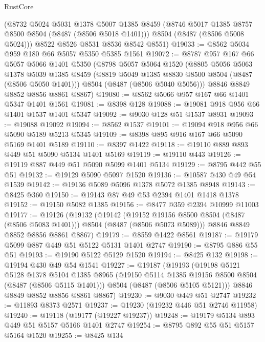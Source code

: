 \begin{lexlean}{RustCore}
\begin{coremodule}
      (@8732
        @5024
        @5031
        @1378
        @5007
        @1385
        @8459
        (@8746 @5017 @1385 @8757 @8500 @8504 (@8487 (@8506 @5018 @1401)))
        @8504
        (@8487 (@8506 @5008 @5024)))
      @8522
      @8526
      @8531
      @8536
      @8542
      @8551)
@19033 := @8562 @5034 @959 @180 @66 @5057 @5350 @5385 @1561
@19072 := @8787
    @957
    @167
    @66
    @5057
    @5066
    @1401
    @5350
    (@8798
      @5057
      @5064
      @1520
      (@8805
        @5056
        @5063
        @1378
        @5039
        @1385
        @8459
        (@8819 @5049 @1385 @8830 @8500 @8504 (@8487 (@8506 @5050 @1401)))
        @8504
        (@8487 (@8506 @5040 @5056)))
      @8846
      @8849
      @8852
      @8856
      @8861
      @8867)
@19080 := @8562 @5066 @957 @167 @66 @1401 @5347 @1401 @1561
@19081 := @8398 @128
@19088 := @19081 @918 @956 @66 @1401 @1537 @1401 @5347
@19092 := @9030 @128 @51 @1537 @8931
@19093 := @19088 @19092
@19094 := @8562 @1537
@19101 := @19094 @918 @956 @66 @5090 @5189 @5213 @5345
@19109 := @8398 @895 @916 @167 @66 @5090 @5169 @1401 @5189
@19110 := @8397 @1422
@19118 := @19110 @889 @893 @449 @51 @5090 @5134 @1401 @5169
@19119 := @19110 @443
@19126 := @19119 @887 @449 @51 @5090 @5099 @1401 @5134
@19129 := @8795 @442 @55 @51
@19132 := @19129 @5090 @5097 @1520
@19136 := @10587 @430 @49 @54 @1539
@19142 := @19136 @5089 @5096 @1378 @5072 @1385 @8948
@19143 := @8425 @360
@19150 := @19143 @87 @49 @53 @2394 @1401 @1418 @1378
@19152 := @19150 @5082 @1385
@19156 := @8477 @359 @2394 @10999 @11003
@19177 := @19126
    (@19132
      (@19142
        (@19152 @19156 @8500 @8504 (@8487 (@8506 @5083 @1401)))
        @8504
        (@8487 (@8506 @5073 @5089)))
      @8846
      @8849
      @8852
      @8856
      @8861
      @8867)
@19179 := @8559 @1422 @8561
@19187 := @19179 @5099 @887 @449 @51 @5122 @5131 @1401 @2747
@19190 := @8795 @886 @55 @51
@19193 := @19190 @5122 @5129 @1520
@19194 := @8425 @132
@19198 := @19194 @430 @49 @54 @1541
@19227 := @19187
    (@19193
      (@19198
        @5121
        @5128
        @1378
        @5104
        @1385
        @8965
        (@19150 @5114 @1385 @19156 @8500 @8504 (@8487 (@8506 @5115 @1401)))
        @8504
        (@8487 (@8506 @5105 @5121)))
      @8846
      @8849
      @8852
      @8856
      @8861
      @8867)
@19230 := @9030 @449 @51 @2747
@19232 := @11893 @8373 @2571
@19237 := @19230 (@19232 @446 @51 @2746 @11958)
@19240 := @19118 (@19177 (@19227 @19237))
@19248 := @19179 @5134 @893 @449 @51 @5157 @5166 @1401 @2747
@19254 := @8795 @892 @55 @51 @5157 @5164 @1520
@19255 := @8425 @134

\end{coremodule}
\end{lexlean}
